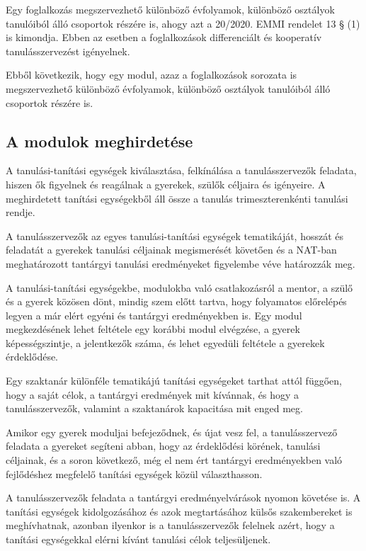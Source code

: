 Egy foglalkozás megszervezhető különböző évfolyamok, különböző osztályok
tanulóiból álló csoportok részére is, ahogy azt a 20/2020. EMMI rendelet
13 § (1) is kimondja. Ebben az esetben a foglalkozások differenciált és
kooperatív tanulásszervezést igényelnek.

Ebből következik, hogy egy modul, azaz a foglalkozások sorozata is
megszervezhető különböző évfolyamok, különböző osztályok tanulóiból álló
csoportok részére is.

\hypertarget{a-modulok-meghirdetese}{%
\subsection{A modulok meghirdetése}\label{a-modulok-meghirdetese}}

A tanulási-tanítási egységek kiválasztása, felkínálása a
tanulásszervezők feladata, hiszen ők figyelnek és reagálnak a gyerekek,
szülők céljaira és igényeire. A meghirdetett tanítási egységekből áll
össze a tanulás trimeszterenkénti tanulási rendje.

A tanulásszervezők az egyes tanulási-tanítási egységek tematikáját,\break
hosszát és feladatát a gyerekek tanulási céljainak megismerését követően
és a NAT-ban meghatározott tantárgyi tanulási eredményeket figyelembe véve
határozzák meg.

A tanulási-tanítási egységekbe, modulokba való csatlakozásról a mentor,
a szülő és a gyerek közösen dönt, mindig szem előtt tartva, hogy
folyamatos előrelépés legyen a már elért egyéni és tantárgyi
eredményekben is. Egy modul megkezdésének lehet feltétele egy korábbi
modul elvégzése, a gyerek képességszintje, a jelentkezők száma, és lehet
egyedüli feltétele a gyerekek érdeklődése.

Egy szaktanár különféle tematikájú tanítási egységeket tarthat attól
függően, hogy a saját célok, a tantárgyi eredmények mit kívánnak, és
hogy a
tanulásszervezők, valamint a szaktanárok kapacitása mit enged meg.

Amikor egy gyerek moduljai befejeződnek, és újat vesz fel, a
tanulásszervező feladata a gyereket segíteni abban, hogy az érdeklődési
körének, tanulási céljainak, és a soron következő, még el nem ért
tantárgyi eredményekben való fejlődéshez megfelelő tanítási egységek
közül választhasson.

A tanulásszervezők feladata a tantárgyi eredményelvárások nyomon
követése is. A tanítási egységek kidolgozásához és azok megtartásához
külsős szakembereket is meghívhatnak, azonban ilyenkor is a
tanulásszervezők felelnek azért, hogy a tanítási egységekkal elérni
kívánt tanulási célok teljesüljenek.

